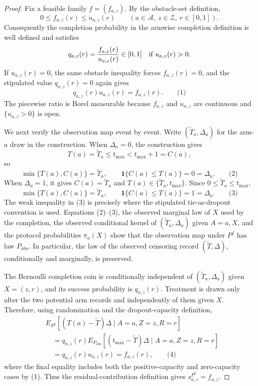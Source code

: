 \documentclass{article}
\begin{document}
\begin{proof}
Fix a feasible family \(f=(f_{a,z})\).  By the obstacle-set definition,
\[
0\leq f_{a,z}(r)\leq u_{a,z}(r)\qquad(a\in\mathcal A,\ z\in\mathcal Z,\ r\in[0,1]).
\]
Consequently the completion probability in the armwise completion definition is well defined and satisfies
\[
q_{a,z}(r)=\frac{f_{a,z}(r)}{u_{a,z}(r)}\in[0,1]
\quad\hbox{if }u_{a,z}(r)>0.
\]
If \(u_{a,z}(r)=0\), the same obstacle inequality forces \(f_{a,z}(r)=0\), and the stipulated value \(q_{a,z}(r)=0\) again gives
\[
q_{a,z}(r)u_{a,z}(r)=f_{a,z}(r).                                      \qquad\text{(1)}
\]
The piecewise ratio is Borel measurable because \(f_{a,z}\) and \(u_{a,z}\) are continuous and \(\{u_{a,z}>0\}\) is open.

We next verify the observation map event by event.  Write \((\widetilde T_a,\Delta_a)\) for the arm-\(a\) draw in the construction.  When \(\Delta_a=0\), the construction gives
\[
T(a)=\widetilde T_a\leq t_{\max}<t_{\max}+1=C(a),
\]
so
\[
\min\{T(a),C(a)\}=\widetilde T_a,
\qquad \mathbf 1\{C(a)\leq T(a)\}=0=\Delta_a.                         \qquad\text{(2)}
\]
When \(\Delta_a=1\), it gives \(C(a)=\widetilde T_a\) and \(T(a)\in\{\widetilde T_a,t_{\max}\}\).  Since \(0\leq\widetilde T_a\leq t_{\max}\),
\[
\min\{T(a),C(a)\}=\widetilde T_a,
\qquad \mathbf 1\{C(a)\leq T(a)\}=1=\Delta_a.                         \qquad\text{(3)}
\]
The weak inequality in (3) is precisely where the stipulated tie-as-dropout convention is used.  Equations (2)--(3), the observed marginal law of \(X\) used by the completion, the observed conditional kernel of \((\widetilde T_a,\Delta_a)\) given \(A=a,X\), and the protocol probabilities \(\pi_a(X)\) show that the observation map under \(P^f\) has law \(P_{\mathrm{obs}}\).  In particular, the law of the observed censoring record \((\widetilde T,\Delta)\), conditionally and marginally, is preserved.

The Bernoulli completion coin is conditionally independent of \((\widetilde T_a,\Delta_a)\) given \(X=(z,r)\), and its success probability is \(q_{a,z}(r)\).  Treatment is drawn only after the two potential arm records and independently of them given \(X\).  Therefore, using randomization and the dropout-capacity definition,
\[
\begin{aligned}
&E_{P^f}[(T(a)-\widetilde T)\Delta\mid A=a,Z=z,R=r]\\
&\quad=q_{a,z}(r)
E_{P_{\mathrm{obs}}}[(t_{\max}-\widetilde T)\Delta
 \mid A=a,Z=z,R=r]\\
&\quad=q_{a,z}(r)u_{a,z}(r)
=f_{a,z}(r),                                                            \qquad\text{(4)}
\end{aligned}
\]
where the final equality includes both the positive-capacity and zero-capacity cases by (1).  Thus the residual-contribution definition gives \(s^{P^f}_{a,z}=f_{a,z}\).


\end{proof}
\end{document}
